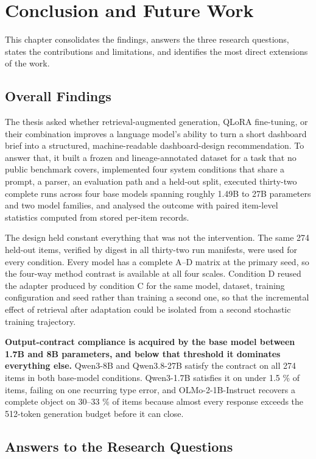 \chapter{Conclusion and Future Work}

This chapter consolidates the findings, answers the three research questions, states the contributions and limitations, and identifies the most direct extensions of the work.

\section{Overall Findings}

The thesis asked whether retrieval-augmented generation, QLoRA fine-tuning, or their combination improves a language model's ability to turn a short dashboard brief into a structured, machine-readable dashboard-design recommendation. To answer that, it built a frozen and lineage-annotated dataset for a task that no public benchmark covers, implemented four system conditions that share a prompt, a parser, an evaluation path and a held-out split, executed thirty-two complete runs across four base models spanning roughly 1.49B to 27B parameters and two model families, and analysed the outcome with paired item-level statistics computed from stored per-item records.

The design held constant everything that was not the intervention. The same 274 held-out items, verified by digest in all thirty-two run manifests, were used for every condition. Every model has a complete A--D matrix at the primary seed, so the four-way method contrast is available at all four scales. Condition D reused the adapter produced by condition C for the same model, dataset, training configuration and seed rather than training a second one, so that the incremental effect of retrieval after adaptation could be isolated from a second stochastic training trajectory.

\textbf{Output-contract compliance is acquired by the base model between 1.7B and 8B parameters, and below that threshold it dominates everything else.} Qwen3-8B and Qwen3.8-27B satisfy the contract on all 274 items in both base-model conditions. Qwen3-1.7B satisfies it on under 1.5 \% of items, failing on one recurring type error, and OLMo-2-1B-Instruct recovers a complete object on 30--33 \% of items because almost every response exceeds the 512-token generation budget before it can close.

\section{Answers to the Research Questions}

